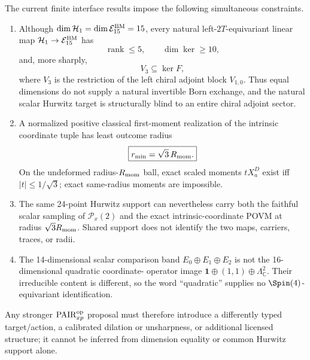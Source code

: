 \documentclass[12pt,a4paper]{article}
\begin{document}
\begin{proposition}
\label{p4:prop:v260-finite-xp-interface-taxonomy}
The current finite interface results impose the following simultaneous
constraints.
\begin{enumerate}[label=(\alph*),leftmargin=2.1em]
\item Although $\dim\mathcal H_1=\dim\mathcal E_{15}^{\rm BM}=15$, every
natural left-$2T$-equivariant linear map
$\mathcal H_1\to\mathcal E_{15}^{\rm BM}$ has
\[
 \boxed{\operatorname{rank}\le5,\qquad\dim\ker\ge10,}
\]
and, more sharply,
\[
 \boxed{V_3\subseteq\ker F,}
\]
where $V_3$ is the restriction of the left chiral adjoint block $V_{1,0}$.
Thus equal dimensions do not supply a natural invertible Born exchange, and
the natural scalar Hurwitz target is structurally blind to an entire chiral
adjoint sector.
\item A normalized positive classical first-moment realization of the
intrinsic coordinate tuple has least outcome radius
\[
 \boxed{r_{\min}=\sqrt3\,R_{\rm mom}.}
\]
On the undeformed radius-$R_{\rm mom}$ ball, exact scaled moments $tX_a^D$
exist iff $|t|\le1/\sqrt3$; exact same-radius moments are impossible.
\item The same 24-point Hurwitz support can nevertheless carry both the
faithful scalar sampling of $\mathcal P_x(2)$ and the exact intrinsic-coordinate
POVM at radius $\sqrt3R_{\rm mom}$.  Shared support does not identify the two
maps, carriers, traces, or radii.
\item The 14-dimensional scalar comparison band
$E_0\oplus E_1\oplus E_2$ is not the 16-dimensional quadratic coordinate-
operator image
$\mathbf1\oplus(1,1)\oplus\Lambda^2_{\mathbb C}$.  Their irreducible content
is different, so the word ``quadratic'' supplies no $\Spin(4)$-equivariant
identification.
\end{enumerate}
Any stronger $\mathrm{PAIR}_{xp}^{\rm op}$ proposal must therefore introduce
a differently typed target/action, a calibrated dilation or unsharpness, or
additional licensed structure; it cannot be inferred from dimension equality
or common Hurwitz support alone.
\end{proposition}
\end{document}
